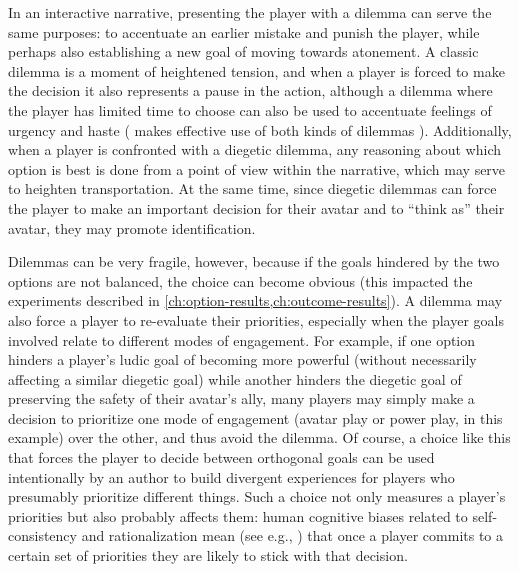 In an interactive narrative, presenting the player with a dilemma can serve the same purposes: to accentuate an earlier mistake and punish the player, while perhaps also establishing a new goal of moving towards atonement.
%
A classic dilemma is a moment of heightened tension, and when a player is forced to make the decision it also represents a pause in the action, although a dilemma where the player has limited time to choose can also be used to accentuate feelings of urgency and haste ( makes effective use of both kinds of dilemmas \citep{TheWalkingDead}).
%
Additionally, when a player is confronted with a diegetic dilemma, any reasoning about which option is best is done from a point of view within the narrative, which may serve to heighten transportation.
%
At the same time, since diegetic dilemmas can force the player to make an important decision for their avatar and to ``think as'' their avatar, they may promote identification.


Dilemmas can be very fragile, however, because if the goals hindered by the two options are not balanced, the choice can become obvious (this impacted the experiments described in \cref{ch:option-results,ch:outcome-results}).
%
A dilemma may also force a player to re-evaluate their priorities, especially when the player goals involved relate to different modes of engagement.
%
For example, if one option hinders a player's ludic goal of becoming more powerful (without necessarily affecting a similar diegetic goal) while another hinders the diegetic goal of preserving the safety of their avatar's ally, many players may simply make a decision to prioritize one mode of engagement (avatar play or power play, in this example) over the other, and thus avoid the dilemma.
%
Of course, a choice like this that forces the player to decide between orthogonal goals can be used intentionally by an author to build divergent experiences for players who presumably prioritize different things.
%
Such a choice not only measures a player's priorities but also probably affects them: human cognitive biases related to self-consistency and rationalization mean (see e.g., \citep{Hall2012}) that once a player commits to a certain set of priorities they are likely to stick with that decision.


